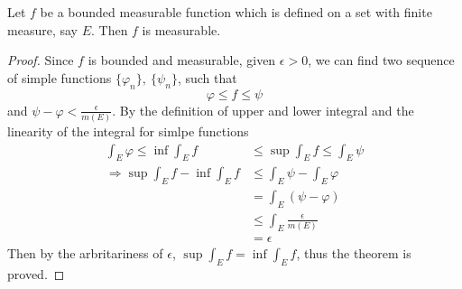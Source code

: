 \documentclass[lang=en, 12pt]{elegantbook}
\begin{document}
            \begin{theorem}
                Let $f$ be a bounded measurable function which is defined on a set with finite measure, say $E$.
            Then $f$ is measurable.
            \end{theorem}         
            \begin{proof}
                Since $f$ is bounded and measurable, given $\epsilon> 0$, we can find two sequence of simple functions $\{\varphi_n\}, \ \{\psi_n\}$, such that 
            \begin{equation*}
                \varphi \leq f \leq \psi 
            \end{equation*}
            and $\psi - \varphi < \frac{\epsilon}{m(E)}$. By the definition of upper and lower integral and the linearity of 
            the integral for simlpe functions  
            \begin{equation*}
                \begin{aligned}
                    \int_E \varphi \leq \inf \int_E f &\leq \sup \int_E f \leq \int_E \psi\\ 
                    \Rightarrow \sup \int_E f - \inf \int_E f &\leq \int_E \psi - \int_E \varphi\\
                    &= \int_E (\psi - \varphi)\\
                    &\leq \int_E \frac{\epsilon}{m(E)} \\
                    &=\epsilon 
                \end{aligned}
            \end{equation*} 
                Then by the arbritariness of $\epsilon$, $\sup \int_E f = \inf \int_E f$, thus the theorem is proved.
            \end{proof}
            
\end{document}
